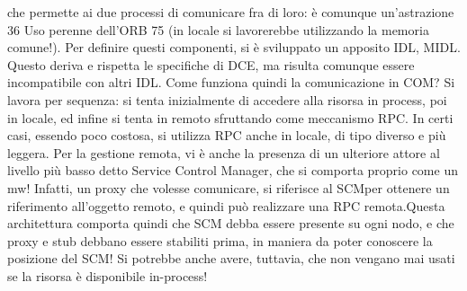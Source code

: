 che permette ai due processi di comunicare fra di loro: è comunque un'astrazione
36 Uso
perenne dell'ORB
75
(in locale si lavorerebbe utilizzando la memoria comune!). Per definire questi
componenti, si è sviluppato un apposito IDL, MIDL. Questo deriva e rispetta
le specifiche di DCE, ma risulta comunque essere incompatibile con altri IDL.
Come funziona quindi la comunicazione in COM? Si lavora per sequenza: si
tenta inizialmente di accedere alla risorsa in process, poi in locale, ed infine si
tenta in remoto sfruttando come meccanismo RPC. In certi casi, essendo poco
costosa, si utilizza RPC anche in locale, di tipo diverso e più leggera.
Per la gestione remota, vi è anche la presenza di un ulteriore attore al livello
più basso detto Service Control Manager, che si comporta proprio come un mw!
Infatti, un proxy che volesse comunicare, si riferisce al SCMper ottenere un
riferimento all'oggetto remoto, e quindi può realizzare una RPC remota.Questa
architettura comporta quindi che SCM debba essere presente su ogni nodo, e
che proxy e stub debbano essere stabiliti prima, in maniera da poter conoscere
la posizione del SCM! Si potrebbe anche avere, tuttavia, che non vengano mai
usati se la risorsa è disponibile in-process!
